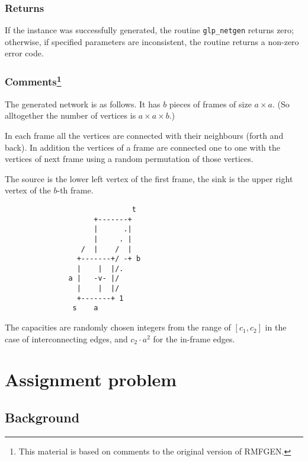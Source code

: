 \subsubsection*{Returns}

If the instance was successfully generated, the routine
\verb|glp_netgen| returns zero; otherwise, if specified parameters are
inconsistent, the routine returns a non-zero error code.

\newpage

\subsubsection*{Comments\footnote{This material is based on comments
to the original version of RMFGEN.}}

The generated network is as follows. It has $b$ pieces of frames of
size $a\times a$. (So alltogether the number of vertices is
$a\times a\times b$.)

In each frame all the vertices are connected with their neighbours
(forth and back). In addition the vertices of a frame are connected
one to one with the vertices of next frame using a random permutation
of those vertices.

The source is the lower left vertex of the first frame, the sink is
the upper right vertex of the $b$-th frame.

\begin{verbatim}
                              t
                     +-------+
                     |      .|
                     |     . |
                  /  |    /  |
                 +-------+/ -+ b
                 |    |  |/.
               a |   -v- |/
                 |    |  |/
                 +-------+ 1
                s    a
\end{verbatim}

The capacities are randomly chosen integers from the range of
$[c_1,c_2]$  in the case of interconnecting edges, and $c_2\cdot a^2$
for the in-frame edges.


\newpage

\section{Assignment problem}

\subsection{Background}

